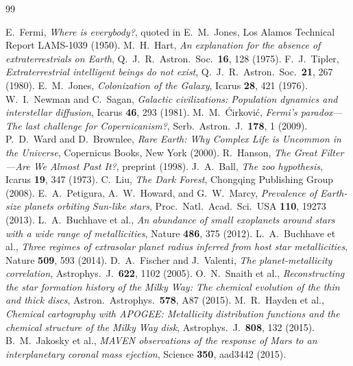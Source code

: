 \documentclass[11pt,a4paper]{article}
\begin{document}
\begin{thebibliography}{99}

 E.~Fermi, \emph{Where is everybody?}, quoted in E.~M.~Jones, Los Alamos Technical Report LAMS-1039 (1950).
 M.~H.~Hart, \emph{An explanation for the absence of extraterrestrials on Earth}, Q.\ J.\ R.\ Astron.\ Soc.\ \textbf{16}, 128 (1975).
 F.~J.~Tipler, \emph{Extraterrestrial intelligent beings do not exist}, Q.\ J.\ R.\ Astron.\ Soc.\ \textbf{21}, 267 (1980).
 E.~M.~Jones, \emph{Colonization of the Galaxy}, Icarus \textbf{28}, 421 (1976).
 W.~I.~Newman and C.~Sagan, \emph{Galactic civilizations: Population dynamics and interstellar diffusion}, Icarus \textbf{46}, 293 (1981).
 M.~M.~{\'C}irkovi{\'c}, \emph{Fermi's paradox—The last challenge for Copernicanism?}, Serb.\ Astron.\ J.\ \textbf{178}, 1 (2009).
 P.~D.~Ward and D.~Brownlee, \emph{Rare Earth: Why Complex Life is Uncommon in the Universe}, Copernicus Books, New York (2000).
 R.~Hanson, \emph{The Great Filter—Are We Almost Past It?}, preprint (1998).
 J.~A.~Ball, \emph{The zoo hypothesis}, Icarus \textbf{19}, 347 (1973).
 C.~Liu, \emph{The Dark Forest}, Chongqing Publishing Group (2008).
 E.~A.~Petigura, A.~W.~Howard, and G.~W.~Marcy, \emph{Prevalence of Earth-size planets orbiting Sun-like stars}, Proc.\ Natl.\ Acad.\ Sci.\ USA \textbf{110}, 19273 (2013).
 L.~A.~Buchhave et al., \emph{An abundance of small exoplanets around stars with a wide range of metallicities}, Nature \textbf{486}, 375 (2012).
 L.~A.~Buchhave et al., \emph{Three regimes of extrasolar planet radius inferred from host star metallicities}, Nature \textbf{509}, 593 (2014).
 D.~A.~Fischer and J.~Valenti, \emph{The planet-metallicity correlation}, Astrophys.\ J.\ \textbf{622}, 1102 (2005).
 O.~N.~Snaith et al., \emph{Reconstructing the star formation history of the Milky Way: The chemical evolution of the thin and thick discs}, Astron.\ Astrophys.\ \textbf{578}, A87 (2015).
 M.~R.~Hayden et al., \emph{Chemical cartography with APOGEE: Metallicity distribution functions and the chemical structure of the Milky Way disk}, Astrophys.\ J.\ \textbf{808}, 132 (2015).
 B.~M.~Jakosky et al., \emph{MAVEN observations of the response of Mars to an interplanetary coronal mass ejection}, Science \textbf{350}, aad3442 (2015).

\end{thebibliography}
\end{document}
